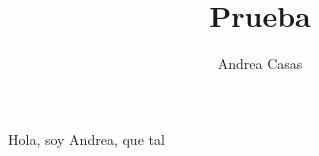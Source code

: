 \documentclass{article}
\title{Prueba}
\author{Andrea Casas}
\theoremstyle{mytheoremstyle}
\theoremstyle{mytheoremstyle}
\theoremstyle{myproblemstyle}
\begin{document}
    \maketitle
    Hola, soy Andrea, que tal
    
\end{document}
